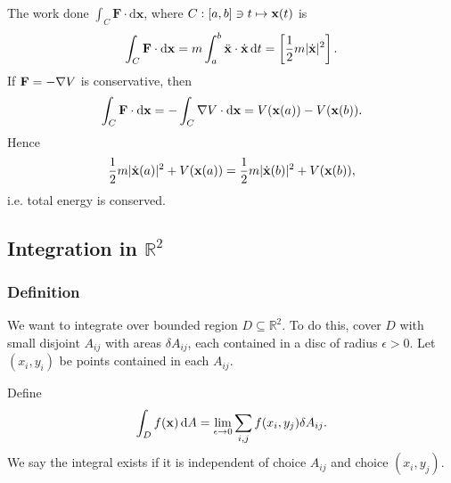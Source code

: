 \begin{example}
    The work done $ \int_{C} \mathbf{F} \cdot\mathrm{d}\mathbf{x} $, where $ C:[a,b]\ni t\mapsto {\bf x}(t) $ is 
    \[
        \int_{C} \mathbf{F} \cdot\mathrm{d}\mathbf{x}= m \int_{a}^{b} \ddot{{\bf x}}\cdot \dot{{\bf x}} \,\mathrm{d}t = \left[ \frac{1}{2}m |\dot{{\bf x}}|^2 \right].
    \]
    If ${\bf F} = -\nabla V$ is conservative, then 
    \[
        \int_{C} \mathbf{F} \cdot\mathrm{d}\mathbf{x} = - \int_{C} \nabla V \cdot\mathrm{d}\mathbf{x} = V({\bf x}(a))-V({\bf x}(b)).
    \]
    Hence
    \[
        \frac{1}{2}m |\dot{{\bf x}}(a)|^2+V({\bf x}(a))=\frac{1}{2}m |\dot{{\bf x}}(b)|^2+V({\bf x}(b)),
    \]
    i.e. total energy is conserved.
\end{example}

\subsection{Integration in $ \mathbb{R}^{2} $}
\subsubsection*{Definition}
We want to integrate over bounded region $ D \subseteq \mathbb{R}^{2} $. To do this, cover $D$ with small disjoint $A_{ij}$ with areas $ \delta A_{ij} $, each contained in a disc of radius $ \epsilon>0 $. Let $ (x_i,y_i) $ be points contained in each $A_{ij}$.
\begin{center}
\end{center}

\begin{definition}
    Define 
    \[
        \int_{D} f({\bf x}) \,\mathrm{d}A = \lim_{\epsilon \to 0} \sum_{i,j} f(x_i,y_j) \delta A_{ij}.
    \]
    We say the integral exists if it is independent of choice $A_{ij}$ and choice $ (x_i,y_j) $.
\end{definition}

